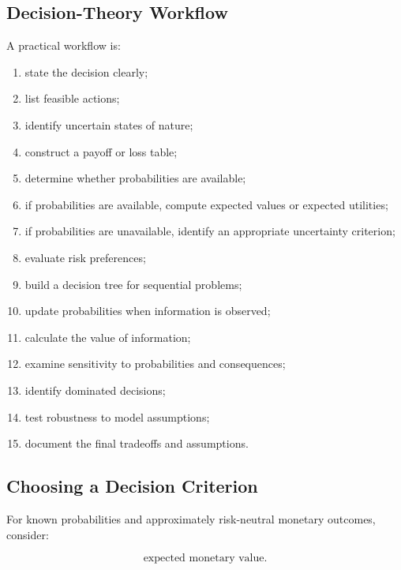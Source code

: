 \subsection{Decision-Theory Workflow}
\label{subsec:decision-theory-workflow}

A practical workflow is:

\begin{enumerate}
    \item state the decision clearly;
    \item list feasible actions;
    \item identify uncertain states of nature;
    \item construct a payoff or loss table;
    \item determine whether probabilities are available;
    \item if probabilities are available, compute expected values or
          expected utilities;
    \item if probabilities are unavailable, identify an appropriate
          uncertainty criterion;
    \item evaluate risk preferences;
    \item build a decision tree for sequential problems;
    \item update probabilities when information is observed;
    \item calculate the value of information;
    \item examine sensitivity to probabilities and consequences;
    \item identify dominated decisions;
    \item test robustness to model assumptions;
    \item document the final tradeoffs and assumptions.
\end{enumerate}

\subsection{Choosing a Decision Criterion}
\label{subsec:choosing-decision-criterion}

For known probabilities and approximately risk-neutral monetary outcomes,
consider:

\[
\boxed{
\text{expected monetary value}.
}
\]

